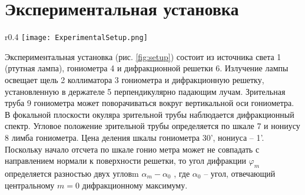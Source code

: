 \section*{Экспериментальная установка}

\begin{wrapfigure}[18]{r}{0.4\textwidth}
	\centering
	\texttt{[image: ExperimentalSetup.png]}
	\caption{Схема установки}
	\label{fig:setup}
\end{wrapfigure}

Экспериментальная установка (рис. \ref{fig:setup}) состоит из источника света 1 (ртутная лампа), гониометра 4 и дифракционной решетки 6. Излучение лампы освещает щель 2 коллиматора 3 гониометра и дифракционную решетку, установленную в держателе 5 перпендикулярно падающим лучам. Зрительная труба 9 гониометра может поворачиваться вокруг вертикальной оси гониометра. В фокальной плоскости окуляра зрительной трубы наблюдается дифракционный спектр. Угловое положение зрительной трубы определяется по шкале 7 и нониусу 8 лимба гониометра. Цена деления шкалы гониометра 30', нониуса – 1'. Поскольку начало отсчета по шкале гонио метра может не совпадать с направлением нормали к поверхности решетки, то угол дифракции $\varphi_m$ определяется разностью двух угловm $\alpha_m - \alpha_0$ , где $\alpha_0$ – угол, отвечающий центральному $m = 0$ дифракционному максимуму.


